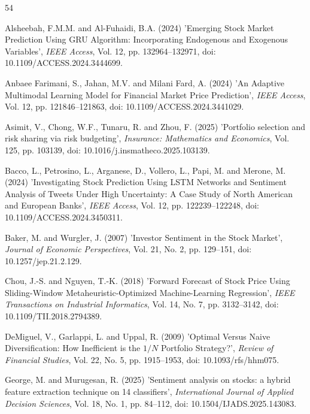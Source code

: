 \begin{thebibliography}{54}

Alsheebah, F.M.M. and Al-Fuhaidi, B.A. (2024) 'Emerging Stock Market Prediction Using GRU Algorithm: Incorporating Endogenous and Exogenous Variables', {\it IEEE Access}, Vol. 12, pp. 132964--132971, doi: 10.1109/ACCESS.2024.3444699.

Anbaee Farimani, S., Jahan, M.V. and Milani Fard, A. (2024) 'An Adaptive Multimodal Learning Model for Financial Market Price Prediction', {\it IEEE Access}, Vol. 12, pp. 121846--121863, doi: 10.1109/ACCESS.2024.3441029.

Asimit, V., Chong, W.F., Tunaru, R. and Zhou, F. (2025) 'Portfolio selection and risk sharing via risk budgeting', {\it Insurance: Mathematics and Economics}, Vol. 125, pp. 103139, doi: 10.1016/j.insmatheco.2025.103139.

Bacco, L., Petrosino, L., Arganese, D., Vollero, L., Papi, M. and Merone, M. (2024) 'Investigating Stock Prediction Using LSTM Networks and Sentiment Analysis of Tweets Under High Uncertainty: A Case Study of North American and European Banks', {\it IEEE Access}, Vol. 12, pp. 122239--122248, doi: 10.1109/ACCESS.2024.3450311.

Baker, M. and Wurgler, J. (2007) 'Investor Sentiment in the Stock Market', {\it Journal of Economic Perspectives}, Vol. 21, No. 2, pp. 129--151, doi: 10.1257/jep.21.2.129.

Chou, J.-S. and Nguyen, T.-K. (2018) 'Forward Forecast of Stock Price Using Sliding-Window Metaheuristic-Optimized Machine-Learning Regression', {\it IEEE Transactions on Industrial Informatics}, Vol. 14, No. 7, pp. 3132--3142, doi: 10.1109/TII.2018.2794389.

DeMiguel, V., Garlappi, L. and Uppal, R. (2009) 'Optimal Versus Naive Diversification: How Inefficient is the $1/N$ Portfolio Strategy?', {\it Review of Financial Studies}, Vol. 22, No. 5, pp. 1915--1953, doi: 10.1093/rfs/hhm075.

George, M. and Murugesan, R. (2025) 'Sentiment analysis on stocks: a hybrid feature extraction technique on 14 classifiers', {\it International Journal of Applied Decision Sciences}, Vol. 18, No. 1, pp. 84--112, doi: 10.1504/IJADS.2025.143083.


\end{thebibliography}
